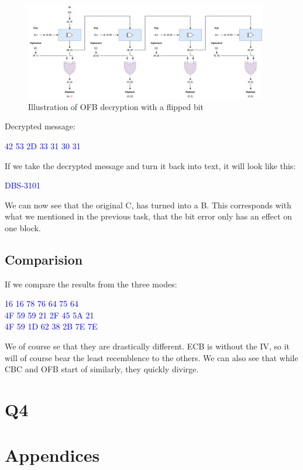 \documentclass{article}
\begin{document}
\begin{figure}[H]
 \centering
  \includegraphics[width=300pt]{img/OFBDec.png}
 \caption{Illustration of OFB decryption with a flipped bit}
 \end{figure}

Decrypted message: 
\begin{tcolorbox}
\begin{center}
\textcolor{blue}{
 42 53 2D 33 31 30 31}
\end{center}
\end{tcolorbox}


If we take the decrypted message and turn it back into text, it will look like this:
\begin{tcolorbox}
\begin{center}
\textcolor{blue}{
\qquad DBS-3101}
\end{center}
\end{tcolorbox}

We can now see that the original C, has turned into a B. This corresponds with what we mentioned in the previous task, that the bit error only has an effect on one block. 

\subsection{Comparision}
If we compare the results from the three modes:
\begin{tcolorbox}
\textcolor{blue}{
 16 16 78 76 64 75 64\\
\qquad 4F 59 59 21 2F 45 5A 21\\
\qquad 4F 59 1D 62 38 2B 7E 7E}
\end{tcolorbox}

We of course se that they are drastically different. ECB is without the IV, so it will of course bear the least recemblence to the others. We can also see that while CBC and OFB start of similarly, they quickly divirge. 



\section{Q4}




\section{Appendices}


\newpage

\nocite{*}



\end{document}
